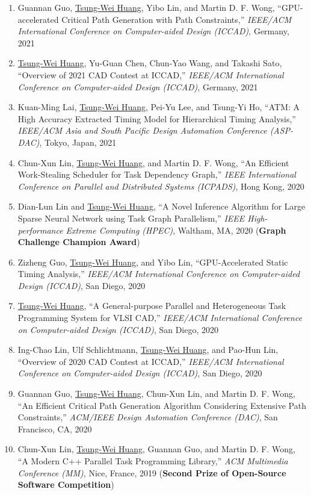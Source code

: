 \documentclass[A4,11pt]{article}
\begin{document}
\begin{enumerate}
    \item Guannan Guo, \underline{Tsung-Wei Huang}, Yibo Lin, and Martin D. F. Wong, ``GPU-accelerated Critical Path Generation with Path Constraints,'' \textit{IEEE/ACM International Conference on Computer-aided Design (ICCAD)}, Germany, 2021
    \item \underline{Tsung-Wei Huang}, Yu-Guan Chen, Chun-Yao Wang, and Takashi Sato, ``Overview of 2021 CAD Contest at ICCAD,'' \textit{IEEE/ACM International Conference on Computer-aided Design (ICCAD)}, Germany, 2021
    \item Kuan-Ming Lai, \underline{Tsung-Wei Huang}, Pei-Yu Lee, and Tsung-Yi Ho, ``ATM: A High Accuracy Extracted Timing Model for Hierarchical Timing Analysis,'' \textit{IEEE/ACM Asia and South Pacific Design Automation Conference (ASP-DAC)}, Tokyo, Japan, 2021
    \item Chun-Xun Lin, \underline{Tsung-Wei Huang}, and Martin D. F. Wong, ``An Efficient Work-Stealing Scheduler for Task Dependency Graph,'' \textit{IEEE International Conference on Parallel and Distributed Systems (ICPADS)}, Hong Kong, 2020
    \item Dian-Lun Lin and \underline{Tsung-Wei Huang}, ``A Novel Inference Algorithm for Large Sparse Neural Network using Task Graph Parallelism,'' \textit{IEEE High-performance Extreme Computing (HPEC)}, Waltham, MA, 2020 (\textbf{Graph Challenge Champion Award})
    \item Zizheng Guo, \underline{Tsung-Wei Huang}, and Yibo Lin, ``GPU-Accelerated Static Timing Analysis,'' \textit{IEEE/ACM International Conference on Computer-aided Design (ICCAD)}, San Diego, 2020 
    \item \underline{Tsung-Wei Huang}, ``A General-purpose Parallel and Heterogeneous Task Programming System for VLSI CAD,'' \textit{IEEE/ACM International Conference on Computer-aided Design (ICCAD)}, San Diego, 2020
    \item Ing-Chao Lin, Ulf Schlichtmann, \underline{Tsung-Wei Huang}, and Pao-Hun Lin, ``Overview of 2020 CAD Contest at ICCAD,'' \textit{IEEE/ACM International Conference on Computer-aided Design (ICCAD)}, San Diego, 2020
    \item Guannan Guo, \underline{Tsung-Wei Huang}, Chun-Xun Lin, and Martin D. F. Wong, ``An Efficient Critical Path Generation Algorithm Considering Extensive Path Constraints,'' \textit{ACM/IEEE Design Automation Conference (DAC)}, San Francisco, CA, 2020
    \item Chun-Xun Lin, \underline{Tsung-Wei Huang}, Guannan Guo, and Martin D. F. Wong, ``A Modern C++ Parallel Task Programming Library,'' \textit{ACM Multimedia Conference (MM)}, Nice, France, 2019 (\textbf{Second Prize of Open-Source Software Competition})

\end{enumerate}
\end{document}
